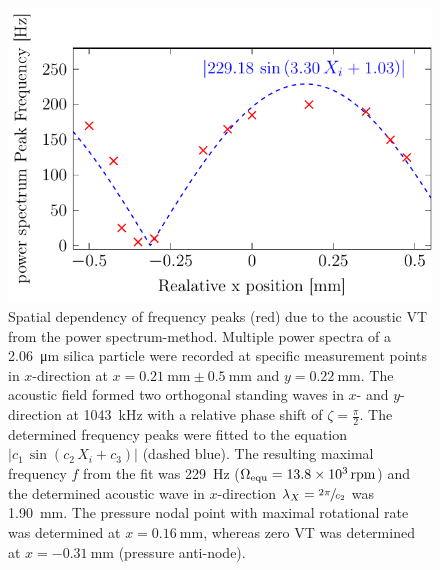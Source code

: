\begin{figure}[tb]
  \centering
  \includegraphics[]{Plots/cache/VT_results.pdf}




    \caption{Spatial dependency of frequency peaks (red) due to the acoustic VT 
      from the power spectrum-method. Multiple power spectra of a 
      \SI{2.06}{\micro\meter} silica particle were recorded at specific 
      measurement points in $x$-direction at $x=\SI{0.21}{\mm}\pm\SI{0.5}{\mm}$ 
      and $y=\SI{0.22}{\mm}$. The acoustic field formed two orthogonal standing 
      waves in $x$- and $y$-direction at \SI{1043}{\kilo\hertz} with a relative 
      phase shift of $\zeta =\frac{\pi}{2}$. The determined frequency peaks were 
      fitted to the equation $\left|c_{1}\,\sin(c_2\,X_i + c_3)\right|$ (dashed 
      blue).  The resulting maximal frequency $f$  from the fit was 
      \SI{229}{\hertz} ($ \Omega_{\mathrm{equ}} = \SI{13.8e3}{rpm}$) and the determined 
      acoustic wave in $x$-direction $\lambda_{X}=\sfrac{2\pi}{c_2}$ was 
    \SI{1.90}{\mm}. The pressure nodal point with maximal rotational rate was 
  determined at $x=\SI{0.16}{\mm}$, whereas zero VT was determined at 
$x=\SI{-0.31}{\mm}$ (pressure anti-node).\label{fig:VT-Fig10}}
\end{figure}
